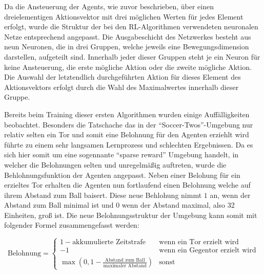 Da die Ansteuerung der Agents, wie zuvor beschrieben, über einen dreielementigen Aktionsvektor mit drei möglichen Werten für jedes Element erfolgt, wurde die Struktur der bei den \ac{RL}-Algorithmen verwendeten neuronalen Netze entsprechend angepasst. Die Ausgabeschicht des Netzwerkes besteht aus neun Neuronen, die in drei Gruppen, welche jeweils eine Bewegungsdimension darstellen, aufgeteilt sind. Innerhalb jeder dieser Gruppen steht je ein Neuron für keine Ansteuerung, die erste mögliche Aktion oder die zweite mögliche Aktion. Die Auswahl der letztendlich durchgeführten Aktion für dieses Element des Aktionsvektors erfolgt durch die Wahl des Maximalwertes innerhalb dieser Gruppe.



Bereits beim Training dieser ersten Algorithmen wurden einige Auffälligkeiten beobachtet. Besonders die Tatschache das in der \enquote{Soccer-Twos}-Umgebung nur relativ selten ein Tor und somit eine Belohnung für den Agenten erziehlt wird führte zu einem sehr langsamen Lernprozess und schlechten Ergebnissen. Da es sich hier somit um eine sogennante \enquote{sparse reward} Umgebung handelt, in welcher die Belohnungen selten und unregelmäßig auftreten, wurde die Behlohnungsfunktion der Agenten angepasst. Neben einer Belohung für ein erzieltes Tor erhalten die Agenten nun fortlaufend einen Belohnung welche auf ihrem Abstand zum Ball baisert. Diese neue Behlohung nimmt \(1\) an, wenn der Abstand zum Ball minimal ist und \(0\) wenn der Abstand maximal, also 32 Einheiten, groß ist. Die neue Belohnungsstruktur der Umgebung kann somit mit folgender Formel zusammengefasst werden:

\[
\text{Belohnung} = \begin{cases} 
	1 - \text{akkumulierte Zeitstrafe} & \text{wenn ein Tor erzielt wird} \\
	-1 & \text{wenn ein Gegentor erzielt wird} \\
	\max\left(0, 1 - \frac{\text{Abstand zum Ball}}{\text{maximaler Abstand}}\right) & \text{sonst}
\end{cases}
\]


